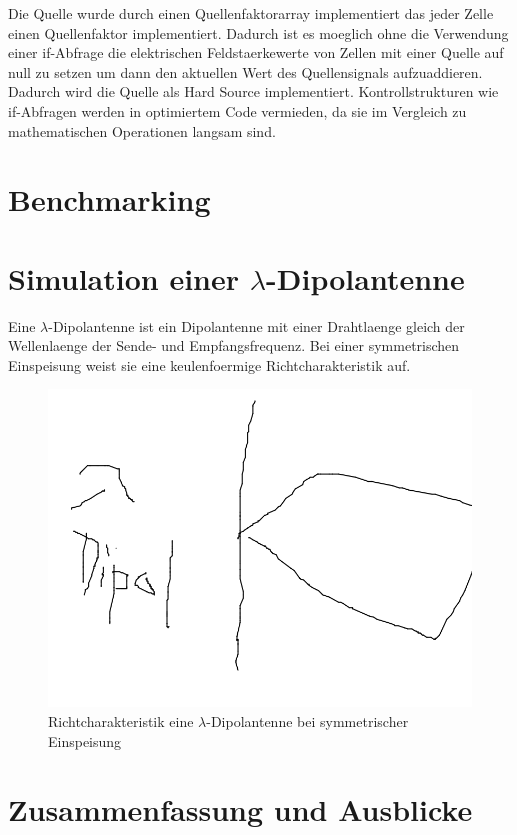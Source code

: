 \documentclass[11pt, ngerman]{article}
\begin{document}


Die Quelle wurde durch einen Quellenfaktorarray implementiert das jeder Zelle
einen Quellenfaktor implementiert. Dadurch ist es moeglich ohne die Verwendung
einer if-Abfrage die elektrischen Feldstaerkewerte von Zellen mit einer
Quelle auf null zu setzen um dann den aktuellen Wert des Quellensignals
aufzuaddieren. Dadurch wird die Quelle als Hard Source implementiert.
Kontrollstrukturen wie if-Abfragen werden in optimiertem Code vermieden,
da sie im Vergleich zu mathematischen Operationen langsam sind.

\section{Benchmarking}


\section{Simulation einer \(\lambda\)-Dipolantenne}
Eine \(\lambda\)-Dipolantenne ist ein Dipolantenne mit einer Drahtlaenge gleich
der Wellenlaenge der Sende- und Empfangsfrequenz.
Bei einer symmetrischen Einspeisung weist sie eine keulenfoermige Richtcharakteristik
auf.

\begin{figure}[H]
\includegraphics[width=\textwidth]{./example-image}
	\caption{Richtcharakteristik eine \(\lambda\)-Dipolantenne bei symmetrischer Einspeisung}
\end{figure}

\section{Zusammenfassung und Ausblicke}


%


\end{document}
